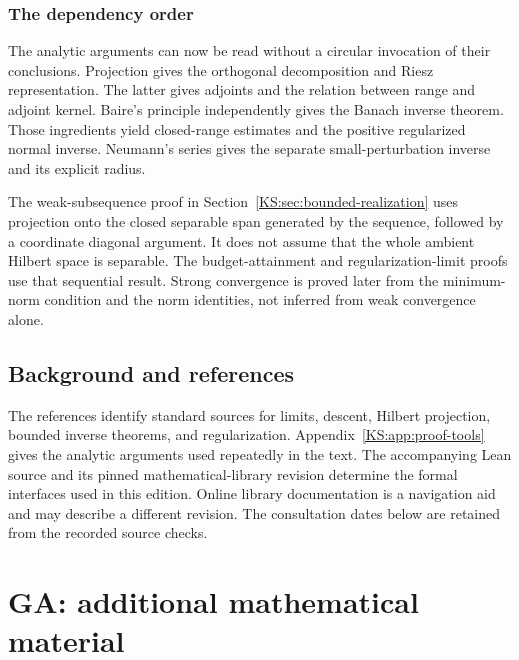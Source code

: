 \documentclass[11pt,oneside,openany]{book}
\newcommand{\chap}[1]{\section{#1}}
\numberwithin{equation}{section}
\begin{document}
\subsection{The dependency order}
The analytic arguments can now be read without a circular invocation of their conclusions. Projection gives the orthogonal decomposition and Riesz representation. The latter gives adjoints and the relation between range and adjoint kernel. Baire's principle independently gives the Banach inverse theorem. Those ingredients yield closed-range estimates and the positive regularized normal inverse. Neumann's series gives the separate small-perturbation inverse and its explicit radius.

The weak-subsequence proof in Section~\ref{KS:sec:bounded-realization} uses projection onto the closed separable span generated by the sequence, followed by a coordinate diagonal argument. It does not assume that the whole ambient Hilbert space is separable. The budget-attainment and regularization-limit proofs use that sequential result. Strong convergence is proved later from the minimum-norm condition and the norm identities, not inferred from weak convergence alone.




\chap{Background and references}\label{KS:app:references}
The references identify standard sources for limits, descent, Hilbert projection, bounded inverse theorems, and regularization. Appendix~\ref{KS:app:proof-tools} gives the analytic arguments used repeatedly in the text. The accompanying Lean source and its pinned mathematical-library revision determine the formal interfaces used in this edition. Online library documentation is a navigation aid and may describe a different revision. The consultation dates below are retained from the recorded source checks.


\chapter{GA: additional mathematical material}
\setcounter{section}{0}
\end{document}
